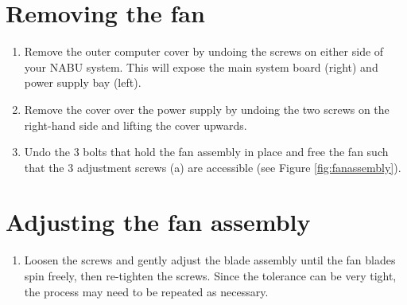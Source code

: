 \section{Removing the fan}
\begin{enumerate}
	\item Remove the outer computer cover by undoing the screws on either side of your NABU system. This will expose the main system board (right) and power supply bay (left).
	\item Remove the cover over the power supply by undoing the two screws on the right-hand side and lifting the cover upwards.
	\item Undo the 3 bolts that hold the fan assembly in place and free the fan such that the 3 adjustment screws (a) are accessible (see Figure \ref{fig:fanassembly}).
\end{enumerate}
\section{Adjusting the fan assembly}
\begin{enumerate}
	\item Loosen the screws and gently adjust the blade assembly until the fan blades spin freely, then re-tighten the screws. Since the tolerance can be very tight, the process may need to be repeated as necessary.
\end{enumerate}

